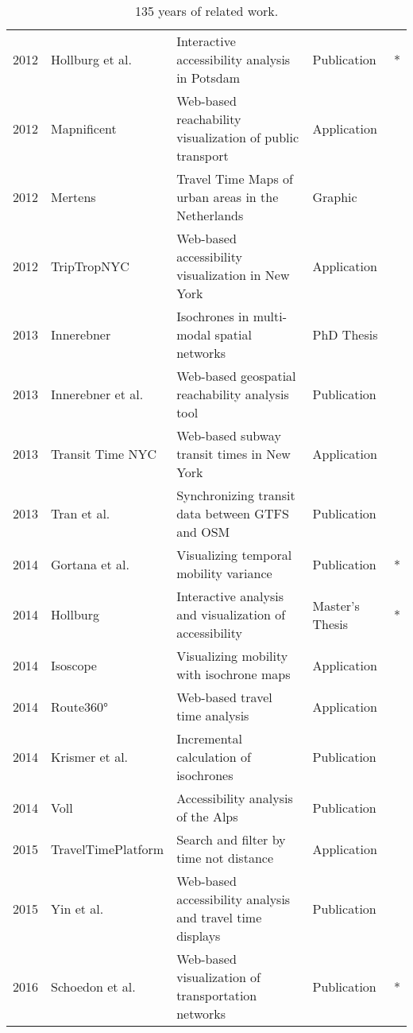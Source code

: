 \begin{table}[htb]
\begin{tabular}{r|l|l|l|c}
        2012 & Hollburg et al. \cite{hollburghier} & Interactive accessibility analysis in Potsdam & Publication  & * \\
        2012 & Mapnificent \cite{Mapnificent}  & Web-based reachability visualization of public transport  & Application  & \\
        2012 & Mertens \cite{meertens2012} & Travel Time Maps of urban areas in the Netherlands  & Graphic  & \\
        2012 & TripTropNYC \cite{TriptropNYC} & Web-based accessibility visualization in New York  & Application  & \\
        2013 & Innerebner \cite{Innerebner2013} & Isochrones in multi-modal spatial networks  & PhD Thesis  & \\
        2013 & Innerebner et al. \cite{innerebner2013isoga} & Web-based geospatial reachability analysis tool  & Publication  & \\
        2013 & Transit Time NYC \cite{TransitTimeNYC} & Web-based subway transit times in New York & Application & \\
        2013 & Tran et al. \cite{tran2013go_sync} & Synchronizing transit data between GTFS and OSM  & Publication  & \\
        2014 & Gortana et al. \cite{gortanaisoscope} & Visualizing temporal mobility variance  & Publication  & * \\
        2014 & Hollburg \cite{Hollburg2014} & Interactive analysis and visualization of accessibility & Master's Thesis  & * \\
        2014 & Isoscope \cite{Isoscope} & Visualizing mobility with isochrone maps  & Application  & \\
        2014 & Route360° \cite{Route360} & Web-based travel time analysis  & Application  & \\
        2014 & Krismer et al. \cite{krismer2014incremental} & Incremental calculation of isochrones  & Publication  & \\
        2014 & Voll \cite{vollerreichbarkeiten} & Accessibility analysis of the Alps  & Publication  & \\
        2015 & TravelTimePlatform \cite{TravelTimePlatform} & Search and filter by time not distance  & Application  & \\
        2015 & Yin et al. \cite{yin2015understanding} & Web-based accessibility analysis and travel time displays  & Publication  & \\
        2016 & Schoedon et al. \cite{STHD2016} & Web-based visualization of transportation networks  & Publication  & * \\
      \end{tabular}
      \caption{135 years of related work.}
      \label{tab:overv:relat}
    \end{table}

